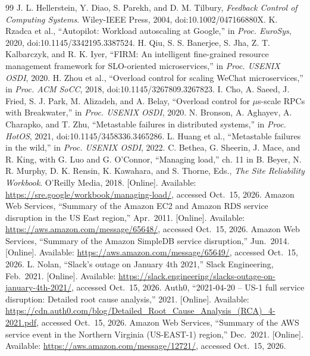 \documentclass[conference]{IEEEtran}
\begin{document}
\begin{thebibliography}{99}
 J. L. Hellerstein, Y. Diao, S. Parekh, and D. M. Tilbury, \emph{Feedback Control of Computing Systems}. Wiley-IEEE Press, 2004, doi:10.1002/047166880X.
 K. Rzadca et al., ``Autopilot: Workload autoscaling at Google,'' in \emph{Proc. EuroSys}, 2020, doi:10.1145/3342195.3387524.
 H. Qiu, S. S. Banerjee, S. Jha, Z. T. Kalbarczyk, and R. K. Iyer, ``FIRM: An intelligent fine-grained resource management framework for SLO-oriented microservices,'' in \emph{Proc. USENIX OSDI}, 2020.
 H. Zhou et al., ``Overload control for scaling WeChat microservices,'' in \emph{Proc. ACM SoCC}, 2018, doi:10.1145/3267809.3267823.
 I. Cho, A. Saeed, J. Fried, S. J. Park, M. Alizadeh, and A. Belay, ``Overload control for $\mu$s-scale RPCs with Breakwater,'' in \emph{Proc. USENIX OSDI}, 2020.
 N. Bronson, A. Aghayev, A. Charapko, and T. Zhu, ``Metastable failures in distributed systems,'' in \emph{Proc. HotOS}, 2021, doi:10.1145/3458336.3465286.
 L. Huang et al., ``Metastable failures in the wild,'' in \emph{Proc. USENIX OSDI}, 2022.
 C. Bethea, G. Sheerin, J. Mace, and R. King, with G. Luo and G. O'Connor, ``Managing load,'' ch. 11 in B. Beyer, N. R. Murphy, D. K. Rensin, K. Kawahara, and S. Thorne, Eds., \emph{The Site Reliability Workbook}. O'Reilly Media, 2018. [Online]. Available: \url{https://sre.google/workbook/managing-load/}, accessed Oct.\ 15, 2026.
 Amazon Web Services, ``Summary of the Amazon EC2 and Amazon RDS service disruption in the US East region,'' Apr.\ 2011. [Online]. Available: \url{https://aws.amazon.com/message/65648/}, accessed Oct.\ 15, 2026.
 Amazon Web Services, ``Summary of the Amazon SimpleDB service disruption,'' Jun.\ 2014. [Online]. Available: \url{https://aws.amazon.com/message/65649/}, accessed Oct.\ 15, 2026.
 L. Nolan, ``Slack's outage on January 4th 2021,'' Slack Engineering, Feb.\ 2021. [Online]. Available: \url{https://slack.engineering/slacks-outage-on-january-4th-2021/}, accessed Oct.\ 15, 2026.
 Auth0, ``2021-04-20 -- US-1 full service disruption: Detailed root cause analysis,'' 2021. [Online]. Available: \url{https://cdn.auth0.com/blog/Detailed_Root_Cause_Analysis_(RCA)_4-2021.pdf}, accessed Oct.\ 15, 2026.
 Amazon Web Services, ``Summary of the AWS service event in the Northern Virginia (US-EAST-1) region,'' Dec.\ 2021. [Online]. Available: \url{https://aws.amazon.com/message/12721/}, accessed Oct.\ 15, 2026.

\end{thebibliography}
\end{document}
